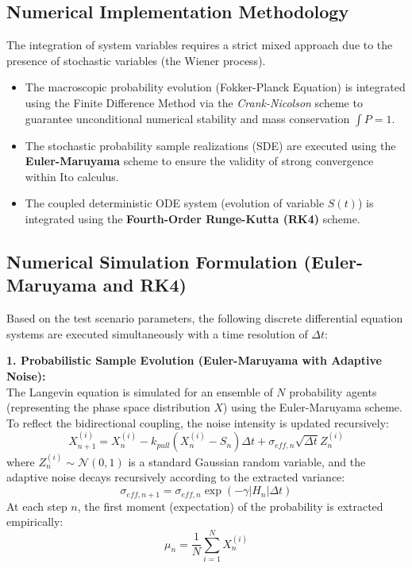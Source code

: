 \documentclass[12pt, a4paper]{article}
\begin{document}
\subsection*{Numerical Implementation Methodology}
The integration of system variables requires a strict mixed approach due to the presence of stochastic variables (the Wiener process).
\begin{itemize}
    \item The macroscopic probability evolution (Fokker-Planck Equation) is integrated using the Finite Difference Method via the \textit{Crank-Nicolson} scheme to guarantee unconditional numerical stability and mass conservation $\int P = 1$.
    \item The stochastic probability sample realizations (SDE) are executed using the \textbf{Euler-Maruyama} scheme to ensure the validity of strong convergence within Ito calculus.
    \item The coupled deterministic ODE system (evolution of variable $S(t)$) is integrated using the \textbf{Fourth-Order Runge-Kutta (RK4)} scheme.
\end{itemize}

\subsection*{Numerical Simulation Formulation (Euler-Maruyama and RK4)}
Based on the test scenario parameters, the following discrete differential equation systems are executed simultaneously with a time resolution of $\Delta t$:

\textbf{1. Probabilistic Sample Evolution (Euler-Maruyama with Adaptive Noise):} \\
The Langevin equation is simulated for an ensemble of $N$ probability agents (representing the phase space distribution $X$) using the Euler-Maruyama scheme. To reflect the bidirectional coupling, the noise intensity is updated recursively:
\begin{equation}
X^{(i)}_{n+1} = X^{(i)}_{n} - k_{pull} (X^{(i)}_{n} - S_{n}) \Delta t + \sigma_{eff, n} \sqrt{\Delta t} Z^{(i)}_{n}
\end{equation}
where $Z^{(i)}_{n} \sim \mathcal{N}(0,1)$ is a standard Gaussian random variable, and the adaptive noise decays recursively according to the extracted variance:
\begin{equation}
\sigma_{eff, n+1} = \sigma_{eff, n} \exp(-\gamma |H_n| \Delta t)
\end{equation}
At each step $n$, the first moment (expectation) of the probability is extracted empirically:
\begin{equation}
\mu_{n} = \frac{1}{N} \sum_{i=1}^{N} X^{(i)}_{n}
\end{equation}
\end{document}

